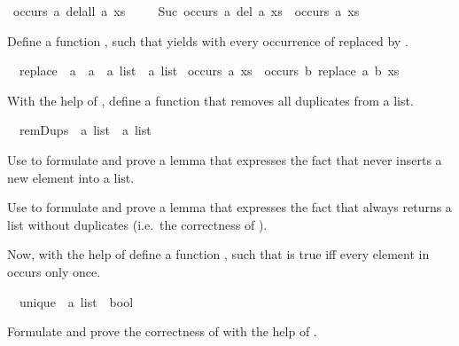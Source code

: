 \begin{isabellebody}
\isamarkupfalse%
\ {\isachardoublequote}occurs\ a\ {\isacharparenleft}delall\ a\ xs{\isacharparenright}\ {\isacharequal}\ {}{\isachardoublequote}\isamarkupfalse%
\ \isanewline
\isamarkupfalse%
\ {\isachardoublequote}Suc\ {\isacharparenleft}occurs\ a\ {\isacharparenleft}del{}\ a\ xs{\isacharparenright}{\isacharparenright}\ {\isacharequal}\ occurs\ a\ xs{\isachardoublequote}\isamarkupfalse%
\isamarkupfalse%
%
\begin{isamarkuptext}%
Define a function , such that  yields  with every occurrence of  replaced by .%
\end{isamarkuptext}%
\isamarkuptrue%
\ \ replace\ {\isacharcolon}{\isacharcolon}\ {\isachardoublequote}{\isacharprime}a\ {\isasymRightarrow}\ {\isacharprime}a\ {\isasymRightarrow}\ {\isacharprime}a\ list\ {\isasymRightarrow}\ {\isacharprime}a\ list{\isachardoublequote}\isanewline
\isanewline
\isamarkupfalse%
\ {\isachardoublequote}occurs\ a\ xs\ {\isacharequal}\ occurs\ b\ {\isacharparenleft}replace\ a\ b\ xs{\isacharparenright}{\isachardoublequote}\isamarkupfalse%
\isamarkupfalse%
%
\begin{isamarkuptext}%
With the help of , define a function  that removes all duplicates from a list.%
\end{isamarkuptext}%
\isamarkuptrue%
\ \ remDups\ {\isacharcolon}{\isacharcolon}\ {\isachardoublequote}{\isacharprime}a\ list\ {\isasymRightarrow}\ {\isacharprime}a\ list{\isachardoublequote}\isamarkupfalse%
%
\begin{isamarkuptext}%
Use  to formulate and prove a lemma that expresses the fact that  never inserts a new element into a list.%
\end{isamarkuptext}%
\isamarkuptrue%
%
\begin{isamarkuptext}%
Use  to formulate and prove a lemma that expresses the fact that  always returns a list without duplicates (i.e.\ the correctness of ).%
\end{isamarkuptext}%
\isamarkuptrue%
%
\begin{isamarkuptext}%
Now, with the help of  define a function , such that  is true iff every element in  occurs only once.%
\end{isamarkuptext}%
\isamarkuptrue%
\ \ unique\ {\isacharcolon}{\isacharcolon}\ {\isachardoublequote}{\isacharprime}a\ list\ {\isasymRightarrow}\ bool{\isachardoublequote}\isamarkupfalse%
%
\begin{isamarkuptext}%
Formulate and prove the correctness of  with the help of .%
\end{isamarkuptext}%
\isamarkuptrue%
\isamarkupfalse%
\end{isabellebody}%
